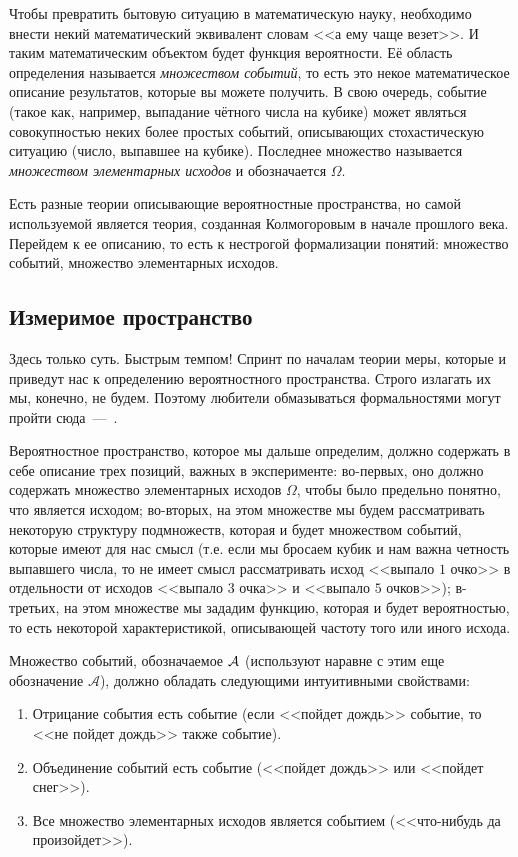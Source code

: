 \documentclass[../TV&MS.tex]{subfiles}
\begin{document}
Чтобы превратить бытовую ситуацию в математическую науку, необходимо 
внести некий математический эквивалент словам <<а ему чаще везет>>.
И таким математическим объектом будет функция вероятности. 
Её область определения называется \emph{множеством событий}, то есть это некое 
математическое описание результатов, которые вы можете получить. В свою очередь, событие 
(такое как, например, выпадание чётного числа на кубике) может являться совокупностью неких 
более простых событий, описывающих стохастическую ситуацию (число, выпавшее на кубике). 
Последнее множество называется \emph{множеством элементарных исходов} и обозначается $\Omega$.  

Есть разные теории описывающие вероятностные пространства, но самой используемой является 
теория, созданная Колмогоровым в начале прошлого века. Перейдем к ее описанию, то есть
к нестрогой формализации понятий: множество событий, множество элементарных исходов.

\subsection{Измеримое пространство}
	
\qquad Здесь только суть. Быстрым темпом! Спринт по началам теории меры,
которые и приведут нас к определению вероятностного пространства. 
Строго излагать их мы, конечно, не будем. Поэтому любители обмазываться 
формальностями могут пройти сюда~---~\cite{Gusev}.

Вероятностное пространство, которое мы дальше определим, должно 
содержать в себе описание трех позиций, важных в эксперименте: 
во-первых, оно должно содержать множество элементарных исходов $\Omega$,
чтобы было предельно понятно, что является исходом; во-вторых,
на этом множестве мы будем рассматривать некоторую структуру подмножеств,
которая и будет множеством событий, которые имеют для нас смысл (т.е.
если мы бросаем кубик и нам важна четность выпавшего числа, то не имеет
смысл рассматривать исход <<выпало $1$ очко>> в отдельности от исходов 
<<выпало $3$ очка>> и <<выпало $5$ очков>>); в-третьих, на этом множестве мы 
зададим функцию, которая и будет вероятностью, то есть некоторой 
характеристикой, описывающей частоту того или иного исхода.

Множество событий, обозначаемое $\mathcal{A}$ (используют наравне с этим еще обозначение 
$\mathscr{A}$), должно обладать следующими интуитивными свойствами:
\begin{enumerate}
	\item Отрицание события есть событие (если <<пойдет дождь>> событие, 
	то <<не пойдет дождь>> также событие).
	\item Объединение событий есть событие (<<пойдет дождь>> или <<пойдет снег>>).
	\item Все множество элементарных исходов является событием (<<что-нибудь да произойдет>>).
\end{enumerate}
\end{document}
